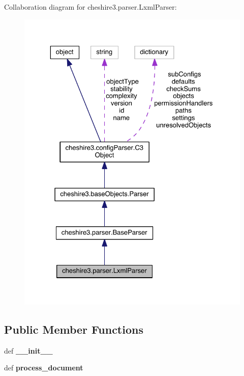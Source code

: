 Collaboration diagram for cheshire3.\-parser.\-Lxml\-Parser\-:
\nopagebreak
\begin{figure}[H]
\begin{center}
\leavevmode
\includegraphics[width=325pt]{classcheshire3_1_1parser_1_1_lxml_parser__coll__graph}
\end{center}
\end{figure}
\subsection*{Public Member Functions}
\begin{DoxyCompactItemize}
\item 
\hypertarget{classcheshire3_1_1parser_1_1_lxml_parser_a4e3d49e31827fcd6eeae1a7879395be7}{def {\bfseries \-\_\-\-\_\-init\-\_\-\-\_\-}}\label{classcheshire3_1_1parser_1_1_lxml_parser_a4e3d49e31827fcd6eeae1a7879395be7}

\item 
\hypertarget{classcheshire3_1_1parser_1_1_lxml_parser_adc532e2a79613f1c5915718c879bcc13}{def {\bfseries process\-\_\-document}}\label{classcheshire3_1_1parser_1_1_lxml_parser_adc532e2a79613f1c5915718c879bcc13}

\end{DoxyCompactItemize}
